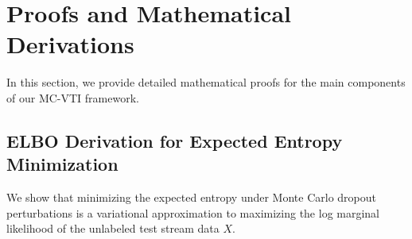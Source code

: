 \documentclass{article}
\theoremstyle{plain}
\theoremstyle{definition}
\theoremstyle{remark}
\begin{document}
\nocite{yang2024bridging,amine2019merging,wang2024dynamic,lv2025potential,lv2025deep,saadati2024decentralized,slimi2024combinatorial,khan2024finding,ladwig2023modular,sarkar2024enhancing,chen2024deep,zhang2025control,wang2021fully,niu2023towards,karmanov2024efficient,yuan2023robust,chen2022contrastive,lee2024entropy,kim2025battling,guo2025smoothing,zhou2025bayesian,cui2025online,guo2025everything,zhang2025domain,yang2021exploiting,yang2022attracting,yang2021generalized,liu2021domain,karim2023curriculum,xu2025unraveling,xia2021adaptive,qiu2021domain,yang2022source,kundu2020universal,tian2025domain,tang2023domain,li2024training,rudner2023tractable,wu2018deterministic,gelberg2024variational,hubin2024sparse,cinquin2024regularized,schodt2024framework,gal2015bayesian,schodt2024variational,hubin2023variational,huix2022variational,jha2022online,son2025improving,nava2026enhanced,sammou2026predictive,chagas2021membranous,musah2025towards,voggu2025melanoma,rafi2025enhancing,hermosilla2021monte,nguyen2021comparison,prete2025towards,klanecek2023uncertainty,cao2024customer,liu2025online,ou2025adaptive,benatia2025continual,niyomugaba2025federated,raja2025design,tang2025continual,wang2026symmetric,santaclara2026continual,ferrero2025continual,kurle2020continual,gholizade2026federated,coursey2026safe}

\clearpage



\clearpage
\appendix
\onecolumn
\section{Proofs and Mathematical Derivations}
\label{sec:appendix_proofs}

In this section, we provide detailed mathematical proofs for the main components of our MC-VTI framework.

\subsection{ELBO Derivation for Expected Entropy Minimization}
We show that minimizing the expected entropy under Monte Carlo dropout perturbations is a variational approximation to maximizing the log marginal likelihood of the unlabeled test stream data $X$.
\end{document}
